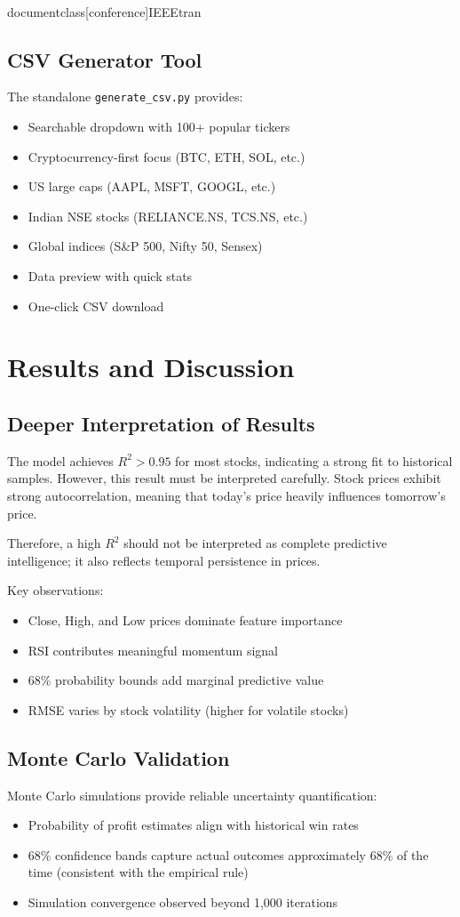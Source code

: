 \\documentclass[conference]{IEEEtran}
\begin{document}
\subsection{CSV Generator Tool}
The standalone \texttt{generate\_csv.py} provides:
\begin{itemize}
    \item Searchable dropdown with 100+ popular tickers
    \item Cryptocurrency-first focus (BTC, ETH, SOL, etc.)
    \item US large caps (AAPL, MSFT, GOOGL, etc.)
    \item Indian NSE stocks (RELIANCE.NS, TCS.NS, etc.)
    \item Global indices (S\&P 500, Nifty 50, Sensex)
    \item Data preview with quick stats
    \item One-click CSV download
\end{itemize}

\section{Results and Discussion}

\subsection{Deeper Interpretation of Results}
The model achieves $R^2 > 0.95$ for most stocks, indicating a strong fit to historical samples. However, this result must be interpreted carefully. Stock prices exhibit strong autocorrelation, meaning that today's price heavily influences tomorrow's price.

Therefore, a high $R^2$ should not be interpreted as complete predictive intelligence; it also reflects temporal persistence in prices.

Key observations:
\begin{itemize}
    \item Close, High, and Low prices dominate feature importance
    \item RSI contributes meaningful momentum signal
    \item 68\% probability bounds add marginal predictive value
    \item RMSE varies by stock volatility (higher for volatile stocks)
\end{itemize}

\subsection{Monte Carlo Validation}
Monte Carlo simulations provide reliable uncertainty quantification:
\begin{itemize}
    \item Probability of profit estimates align with historical win rates
    \item 68\% confidence bands capture actual outcomes approximately 68\% of the time (consistent with the empirical rule)
    \item Simulation convergence observed beyond 1,000 iterations
\end{itemize}
\end{document}
